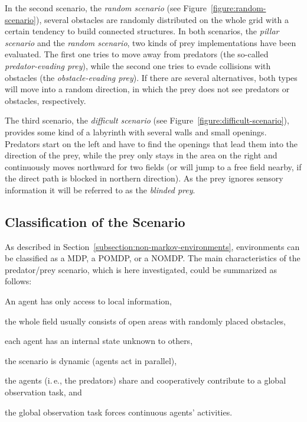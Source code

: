 In the second scenario, the \emph{random scenario} (see Figure~\ref{figure:random-scenario}), several obstacles are randomly distributed on the whole grid with a certain tendency to build connected structures. In both scenarios, the \emph{pillar scenario} and the \emph{random scenario}, two kinds of prey implementations have been evaluated. The first one tries to move away from predators (the so-called \emph{predator-evading prey}), while the second one tries to evade collisions with obstacles (the \emph{obstacle-evading prey}). %
If there are several alternatives, both types will move into a random direction, in which the prey does not see predators or obstacles, respectively.

The third scenario, the \emph{difficult scenario} (see Figure~\ref{figure:difficult-scenario}), provides some kind of a labyrinth with several walls and small openings. Predators start on the left and have to find the openings that lead them into the direction of the prey, while the prey only stays in the area on the right and continuously moves northward for two fields (or will jump to a free field nearby, if the direct path is blocked in northern direction). As the prey ignores sensory information it will be referred to as the \emph{blinded prey}.

\subsection{Classification of the Scenario}
\label{subsection:scenario-classification}

As described in Section~\ref{subsection:non-markov-environments}, environments can be classified as a MDP, a POMDP, or a NOMDP. The main characteristics of the predator/prey scenario, which is here investigated, could be summarized as follows:

\begin{enumerate*}
	\item An agent has only access to local information,
	\item the whole field usually consists of open areas with randomly placed obstacles,
	\item each agent has an internal state unknown to others,
	\item the scenario is dynamic (agents act in parallel),
	\item the agents (i.\,e., the predators) share and cooperatively contribute to a glo\-bal observation task, and
	\item the global observation task forces continuous agents' activities.  
\end{enumerate*}

